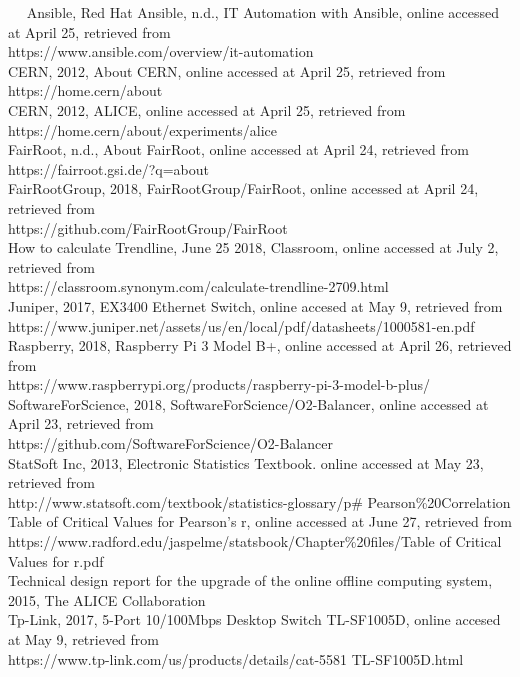 ~~ Ansible, Red Hat Ansible, n.d., IT Automation with Ansible, online accessed at April 25, retrieved from \\https://www.ansible.com/overview/it-automation\\

CERN, 2012, About CERN, online accessed at April 25, retrieved from \\https://home.cern/about\\

CERN, 2012, ALICE, online accessed at April 25, retrieved from \\https://home.cern/about/experiments/alice\\

FairRoot, n.d., About FairRoot, online accessed at April 24, retrieved from \\https://fairroot.gsi.de/?q=about\\

FairRootGroup, 2018, FairRootGroup/FairRoot, online accessed at April 24, retrieved from \\https://github.com/FairRootGroup/FairRoot\\

How to calculate Trendline, June 25 2018, Classroom, online accessed at July 2, retrieved from \\https://classroom.synonym.com/calculate-trendline-2709.html\\

Juniper, 2017, EX3400 Ethernet Switch, online accesed at May 9, retrieved from \\https://www.juniper.net/assets/us/en/local/pdf/datasheets/1000581-en.pdf\\

Raspberry, 2018, Raspberry Pi 3 Model B+, online accessed at April 26, retrieved from \\https://www.raspberrypi.org/products/raspberry-pi-3-model-b-plus/\\

SoftwareForScience, 2018, SoftwareForScience/O2-Balancer, online accessed at April 23, retrieved from \\https://github.com/SoftwareForScience/O2-Balancer\\

StatSoft Inc, 2013, Electronic Statistics Textbook. online accessed at May 23, retrieved from  \\http://www.statsoft.com/textbook/statistics-glossary/p\# Pearson\%20Correlation\\

Table of Critical Values for Pearson's r, online accessed at June 27, retrieved from \\https://www.radford.edu/jaspelme/statsbook/Chapter\%20files/Table of Critical Values for r.pdf\\

Technical design report for the upgrade of the online offline computing system, 2015, The ALICE Collaboration\\

Tp-Link, 2017, 5-Port 10/100Mbps Desktop Switch TL-SF1005D, online accesed at May 9, retrieved from \\https://www.tp-link.com/us/products/details/cat-5581 TL-SF1005D.html\\